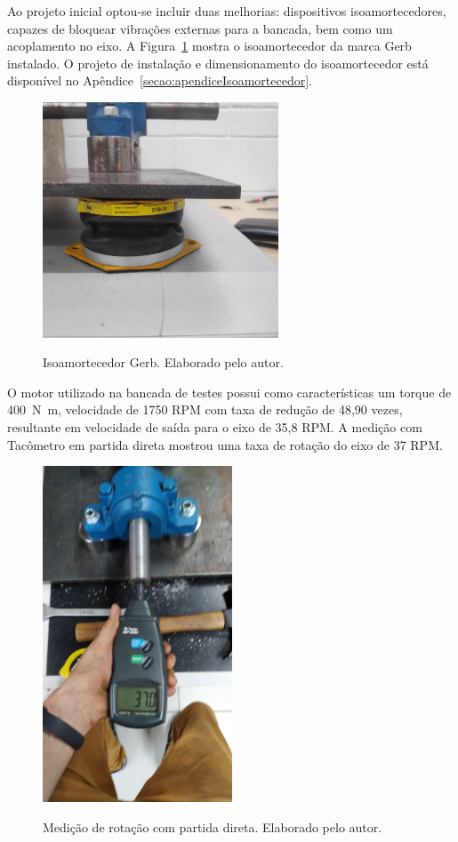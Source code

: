\documentclass[
	12pt,				
	oneside,			
	a4paper,			
	english,			
	brazil,			
	]{abntex2ppgsi}
\begin{document}
Ao projeto inicial optou-se incluir duas melhorias: dispositivos isoamortecedores, capazes de bloquear vibrações externas para a bancada, bem como um acoplamento no eixo. A Figura~\ref{isoamortecedor_bancada} mostra o isoamortecedor da marca Gerb instalado. O projeto de instalação e dimensionamento do isoamortecedor está disponível no Apêndice~\ref{secao:apendiceIsoamortecedor}. 
 
\begin{figure}[H]
\centering
\caption {Isoamortecedor Gerb. Elaborado pelo autor.}
\includegraphics[width=\textwidth,height=70mm,keepaspectratio]{isoamortecedor_bancada}
\label{isoamortecedor_bancada}
\end{figure}


O motor utilizado na bancada de testes possui como características um torque de \SI{400}{\newton\metre}, velocidade de 1750 RPM com taxa de redução de 48,90 vezes, resultante em velocidade de saída para o eixo de 35,8 RPM. A medição com Tacômetro em partida direta mostrou uma taxa de rotação do eixo de 37 RPM. 

\begin{figure}[H]
\centering
\caption {Medição de rotação com partida direta. Elaborado pelo autor.}
\includegraphics[width=\textwidth,height=100mm,keepaspectratio]{tacometro_lucas}
\label{tacometro_lucas}
\end{figure}
 
\end{document}
